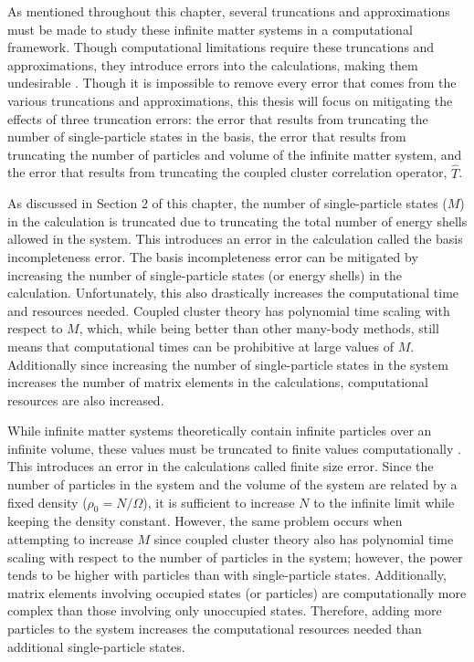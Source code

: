 As mentioned throughout this chapter, several truncations and approximations must be made to study these infinite matter systems in a computational framework. Though computational limitations require these truncations and approximations, they introduce errors into the calculations, making them undesirable \cite{Ref1, Ref2}. Though it is impossible to remove every error that comes from the various truncations and approximations, this thesis will focus on mitigating the effects of three truncation errors: the error that results from truncating the number of single-particle states in the basis, the error that results from truncating the number of particles and volume of the infinite matter system, and the error that results from truncating the coupled cluster correlation operator, $\hat{T}$.

As discussed in Section 2 of this chapter, the number of single-particle states ($M$) in the calculation is truncated due to truncating the total number of energy shells allowed in the system. This introduces an error in the calculation called the basis incompleteness error. The basis incompleteness error can be mitigated by increasing the number of single-particle states (or energy shells) in the calculation. Unfortunately, this also drastically increases the computational time and resources needed. Coupled cluster theory has polynomial time scaling with respect to $M$, which, while being better than other many-body methods, still means that computational times can be prohibitive at large values of $M$.  Additionally since increasing the number of single-particle states in the system increases the number of matrix elements in the calculations, computational resources are also increased.

While infinite matter systems theoretically contain infinite particles over an infinite volume, these values must be truncated to finite values computationally \cite{Ref8}. This introduces an error in the calculations called finite size error. Since the number of particles in the system and the volume of the system are related by a fixed density ($\rho_0 = N/\Omega$), it is sufficient to increase $N$ to the infinite limit while keeping the density constant. However, the same problem occurs when attempting to increase $M$ since coupled cluster theory also has polynomial time scaling with respect to the number of particles in the system; however, the power tends to be higher with particles than with single-particle states. Additionally, matrix elements involving occupied states (or particles) are computationally more complex than those involving only unoccupied states. Therefore, adding more particles to the system increases the computational resources needed than additional single-particle states.

